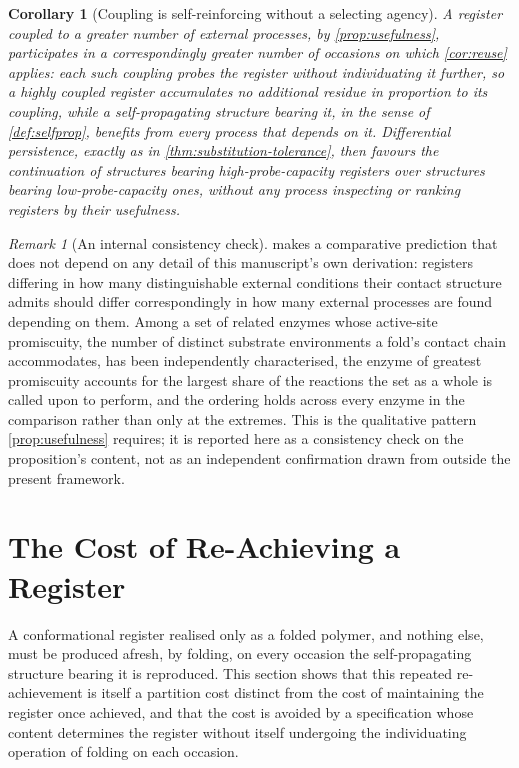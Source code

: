 \documentclass[11pt,twocolumn,a4paper]{article}
\theoremstyle{plain}
\newtheorem{corollary}[theorem]{Corollary}
\theoremstyle{definition}
\theoremstyle{remark}
\newtheorem{remark}[theorem]{Remark}
\begin{document}
\begin{corollary}[Coupling is self-reinforcing without a selecting agency]
\label{cor:coupling-reinforcement}
A register coupled to a greater number of external processes, by
\cref{prop:usefulness}, participates in a correspondingly greater number
of occasions on which \cref{cor:reuse} applies: each such coupling probes
the register without individuating it further, so a highly coupled
register accumulates no additional residue in proportion to its coupling,
while a self-propagating structure bearing it, in the sense of
\cref{def:selfprop}, benefits from every process that depends on it.
Differential persistence, exactly as in \cref{thm:substitution-tolerance},
then favours the continuation of structures bearing high-probe-capacity
registers over structures bearing low-probe-capacity ones, without any
process inspecting or ranking registers by their usefulness.
\end{corollary}

\begin{remark}[An internal consistency check]
\label{rem:probe-capacity-check}
 makes a comparative prediction that does not
depend on any detail of this manuscript's own derivation: registers
differing in how many distinguishable external conditions their contact
structure admits should differ correspondingly in how many external
processes are found depending on them. Among a set of related enzymes
whose active-site promiscuity, the number of distinct substrate
environments a fold's contact chain accommodates, has been independently
characterised, the enzyme of greatest promiscuity accounts for the
largest share of the reactions the set as a whole is called upon to
perform, and the ordering holds across every enzyme in the comparison
rather than only at the extremes. This is the qualitative pattern
\cref{prop:usefulness} requires; it is reported here as a consistency
check on the proposition's content, not as an independent confirmation
drawn from outside the present framework.
\end{remark}

\section{The Cost of Re-Achieving a Register}
\label{sec:reachieving}

A conformational register realised only as a folded polymer, and nothing
else, must be produced afresh, by folding, on every occasion the
self-propagating structure bearing it is reproduced. This section shows
that this repeated re-achievement is itself a partition cost distinct from
the cost of maintaining the register once achieved, and that the cost is
avoided by a specification whose content determines the register without
itself undergoing the individuating operation of folding on each
occasion.
\end{document}
